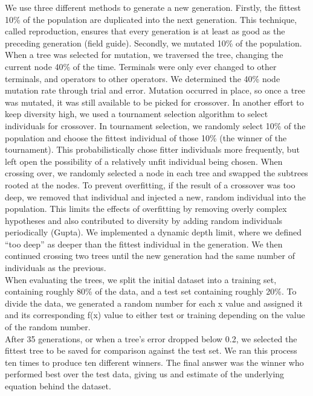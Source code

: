 	We use three different methods to generate a new
        generation. Firstly, the fittest 10\% of the population are
        duplicated into the next generation. This technique, called
        reproduction, ensures that every generation is at least as
        good as the preceding generation (field guide). Secondly, we
        mutated 10\% of the population. When a tree was selected for
        mutation, we traversed the tree, changing the current node
        40\% of the time. Terminals were only ever changed to other
        terminals, and operators to other operators. We determined the
        40\% node mutation rate through trial and error. Mutation
        occurred in place, so once a tree was mutated, it was still
        available to be picked for crossover. In another effort to
        keep diversity high, we used a tournament selection algorithm
        to select individuals for crossover. In tournament selection,
        we randomly select 10\% of the population and choose the
        fittest individual of those 10\% (the winner of the
        tournament). This probabilistically chose fitter individuals
        more frequently, but left open the possibility of a relatively
        unfit individual being chosen. When crossing over, we randomly
        selected a node in each tree and swapped the subtrees rooted
        at the nodes. To prevent overfitting, if the result of a
        crossover was too deep, we removed that individual and
        injected a new, random individual into the population. This
        limits the effects of overfitting by removing overly complex
        hypotheses and also contributed to diversity by adding random
        individuals periodically (Gupta). We implemented a dynamic
        depth limit, where we defined “too deep” as deeper than the
        fittest individual in the generation. We then continued
        crossing two trees until the new generation had the same
        number of individuals as the previous.\\

	When evaluating the trees, we split the initial dataset into a
        training set, containing roughly 80\% of the data, and a test
        set containing roughly 20\%. To divide the data, we generated
        a random number for each x value and assigned it and its
        corresponding f(x) value to either test or training depending
        on the value of the random number.\\

	After 35 generations, or when a tree’s error dropped below
        0.2, we selected the fittest tree to be saved for comparison
        against the test set. We ran this process ten times to produce
        ten different winners. The final answer was the winner who
        performed best over the test data, giving us and estimate of
        the underlying equation behind the dataset.


